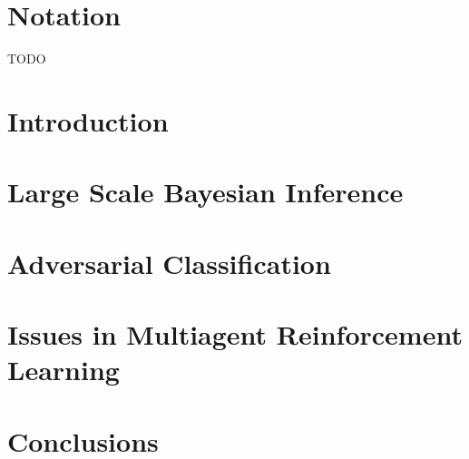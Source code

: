 \documentclass[a4paper, 11pt, openright, twoside]{reportPhD}
\numberwithin{figure}{chapter}
\numberwithin{table}{chapter}
\numberwithin{equation}{chapter}
\begin{document}

\indice
\indicetablas
\indicefiguras
\indicealgoritmos

\chapter*{Notation}
TODO

\chapter{Introduction}\label{cha:intro}
\setcounter{page}{1}


\begin{subappendices}

\end{subappendices}


\chapter{Large Scale Bayesian Inference}\label{cha:bayes}


\begin{subappendices}

\end{subappendices}


\chapter{Adversarial Classification}\label{cha:adv}



\chapter{Issues in Multiagent Reinforcement Learning}\label{cha:ararl}


\begin{subappendices}

\end{subappendices}


\chapter{Conclusions}\label{cha:conclusions}





%
%
%



{}
\newrefcontext[sorting=nyt]
\printbibliography
\end{document}
